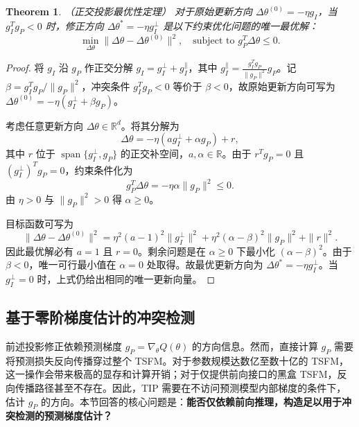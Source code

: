 \documentclass{article}
\newtheorem{theorem}{Theorem}
\begin{document}
\begin{theorem}\label{th:orthogonal_projection}（正交投影最优性定理）
	对于原始更新方向 $\Delta\theta^{(0)} = -\eta g_I$，当 $g_I^T g_P < 0$ 时，修正方向 $\Delta\theta^\ast = -\eta g_I^\perp$ 是以下约束优化问题的唯一最优解：
	\begin{equation}
		\min_{\Delta\theta} \|\Delta\theta - \Delta\theta^{(0)}\|^2,\quad \text{subject to } g_P^T \Delta\theta \leq 0.
	\end{equation}
\end{theorem}
\begin{proof}
	将 $g_I$ 沿 $g_P$ 作正交分解 $g_I = g_I^\perp + g_I^\parallel$，其中 $g_I^\parallel = \frac{g_I^T g_P}{\|g_P\|^2} g_P$。记 $\beta = g_I^T g_P / \|g_P\|^2$，冲突条件 $g_I^T g_P < 0$ 等价于 $\beta < 0$，故原始更新方向可写为 $\Delta\theta^{(0)} = -\eta(g_I^\perp + \beta g_P)$。

	考虑任意更新方向 $\Delta\theta \in \mathbb{R}^d$。将其分解为
	\begin{equation*}
		\Delta\theta = -\eta(a g_I^\perp + \alpha g_P) + r,
	\end{equation*}
	其中 $r$ 位于 $\operatorname{span}\{g_I^\perp,g_P\}$ 的正交补空间，$a,\alpha\in\mathbb{R}$。由于 $r^Tg_P=0$ 且 $(g_I^\perp)^Tg_P=0$，约束条件化为
	\begin{equation*}
		g_P^T\Delta\theta=-\eta\alpha\|g_P\|^2\leq 0.
	\end{equation*}
	由 $\eta>0$ 与 $\|g_P\|^2>0$ 得 $\alpha\geq0$。

	目标函数可写为
	\begin{equation*}
		\|\Delta\theta-\Delta\theta^{(0)}\|^2
		=\eta^2(a-1)^2\|g_I^\perp\|^2+\eta^2(\alpha-\beta)^2\|g_P\|^2+\|r\|^2.
	\end{equation*}
	因此最优解必有 $a=1$ 且 $r=0$。剩余问题是在 $\alpha\geq0$ 下最小化 $(\alpha-\beta)^2$。由于 $\beta<0$，唯一可行最小值在 $\alpha=0$ 处取得。故最优更新方向为 $\Delta\theta^\ast=-\eta g_I^\perp$。当 $g_I^\perp=0$ 时，上式仍给出相同的唯一更新向量。
\end{proof}

\subsection{基于零阶梯度估计的冲突检测}

前述投影修正依赖预测梯度 $g_P = \nabla_\theta Q(\theta)$ 的方向信息。然而，直接计算 $g_P$ 需要将预测损失反向传播穿过整个 TSFM。对于参数规模达数亿至数十亿的 TSFM，这一操作会带来极高的显存和计算开销；对于仅提供前向接口的黑盒 TSFM，反向传播路径甚至不存在。因此，TIP 需要在不访问预测模型内部梯度的条件下，估计 $g_P$ 的方向。本节回答的核心问题是：\textbf{能否仅依赖前向推理，构造足以用于冲突检测的预测梯度估计？}
\end{document}
